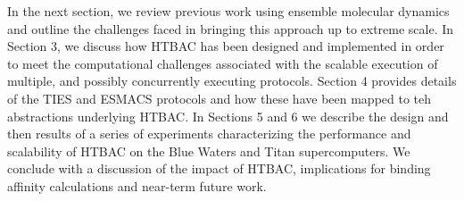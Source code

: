 
In the next section, we review previous work using ensemble molecular dynamics
and outline the challenges faced in bringing this approach up to extreme
scale. In Section 3, we discuss how HTBAC has been designed and implemented in
order to meet the computational challenges associated with the scalable
execution of multiple, and possibly concurrently executing protocols. Section
4 provides details of the TIES and ESMACS protocols and how these have been
mapped to teh abstractions underlying HTBAC. In Sections 5 and 6 we describe
the design and then results of a series of experiments characterizing the
performance and scalability of HTBAC on the Blue Waters and Titan
supercomputers. We conclude with a discussion of the impact of HTBAC,
implications for binding affinity calculations and near-term future work.
